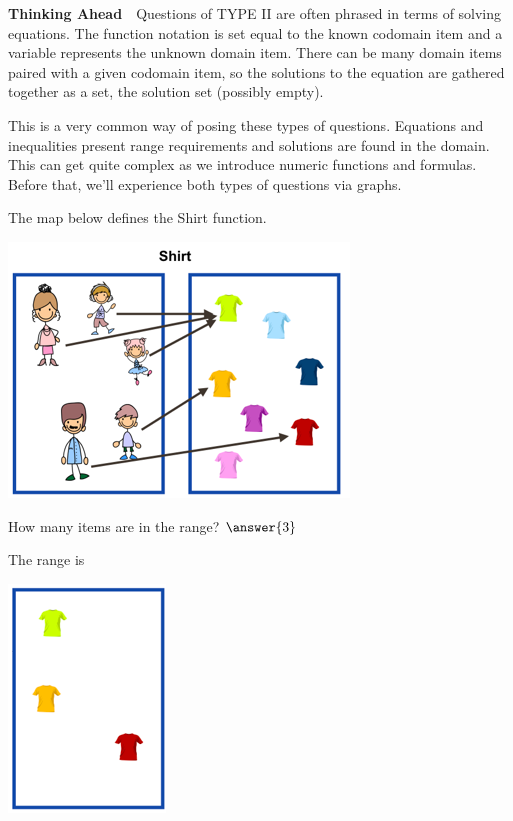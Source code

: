 \documentclass{ximera}
\begin{document}
\textbf{Thinking Ahead}\ \
Questions of TYPE II are often phrased in terms of solving equations. The function notation is set equal to the known codomain item and a variable represents the unknown domain item. There can be many domain items paired with a given codomain item, so the solutions to the equation are gathered together as a set, the solution set (possibly empty).

This is a very common way of posing these types of questions. Equations and inequalities present range requirements and solutions are found in the domain.  This can get quite complex as we introduce numeric functions and formulas.  Before that, we'll experience both types of questions via graphs.\quad \\


\begin{question}

The map below defines the Shirt function.
\begin{image}
\includegraphics{pics/shirt_func.png}
\end{image}
How many items are in the range?  $\answer{3}$
\begin{feedback}
The range is
\begin{image}
\includegraphics{pics/shirt_range.png}
\end{image}
\end{feedback}

\end{question}
\end{document}
